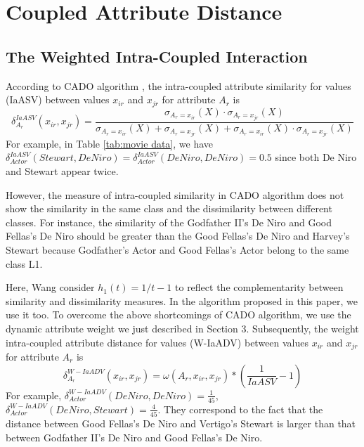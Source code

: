 \documentclass[review]{elsarticle}
\begin{document}
\section{Coupled Attribute Distance}
\subsection{The Weighted Intra-Coupled Interaction}
According to CADO algorithm \cite{WangC2015CADO}, the intra-coupled attribute similarity for values (IaASV) between values $x_{ir}$ and $x_{jr}$ for attribute $A_r$ is
\begin{equation}
\delta_{A_r}^{IaASV}(x_{ir},x_{jr}) = \frac{\sigma_{A_r = x_{ir}}(X) \cdot \sigma_{A_r = x_{jr}}(X)}{\sigma_{A_r = x_{ir}}(X) + \sigma_{A_r = x_{jr}}(X) + \sigma_{A_r = x_{ir}}(X) \cdot \sigma_{A_r = x_{jr}}(X)}
\label{equ17}
\end{equation}
For example, in Table \ref{tab:movie data}, we have $\delta_{Actor}^{IaASV}(Stewart,De Niro) = \delta_{Actor}^{IaASV}(De Niro,De Niro) = 0.5$ since both De Niro and Stewart appear twice.

However, the measure of intra-coupled similarity in CADO algorithm does not show the similarity in the same class and the dissimilarity between different classes. For instance, the similarity of the Godfather II's De Niro and Good Fellas's De Niro should be greater than the Good Fellas's De Niro and Harvey's Stewart because Godfather's Actor and Good Fellas's Actor belong to the same class L1.

Here, Wang consider $h_1(t) = 1/t - 1$ to reflect the complementarity between similarity and dissimilarity measures. In the algorithm proposed in this paper, we use it too. To overcome the above shortcomings of CADO algorithm, we use the dynamic attribute weight we just described in Section 3. Subsequently, the weight intra-coupled attribute distance for values (W-IaADV) between values $x_{ir}$ and $x_{jr}$ for attribute $A_r$ is
\begin{equation}
\label{equ18}
\delta_{A_r}^{W-IaADV}(x_{ir},x_{jr}) = \omega(A_r,x_{ir},x_{jr}) * (\frac{1}{IaASV} - 1)
\end{equation}
For example, $\delta_{Actor}^{W-IaADV}(De Niro,De Niro) = \frac{1}{45}$, $\delta_{Actor}^{W-IaADV}(De Niro,Stewart) = \frac{4}{45}$. They correspond to the fact that the distance between Good Fellas's De Niro and Vertigo's Stewart is larger than that between Godfather II's De Niro and Good Fellas's De Niro.
\end{document}
